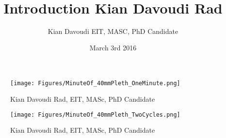 \documentclass{IEEEtran}
\title{Introduction Kian Davoudi Rad}
\author{Kian Davoudi EIT, MASC, PhD Candidate}
\date{March 3rd 2016}
\begin{document}
\maketitle

\begin{figure}[h!]
\centering
\texttt{[image: Figures/MinuteOf\_40mmPleth\_OneMinute.png]}
\caption{Kian Davoudi Rad, EIT, MASc, PhD Candidate}
\label{fig:kian}
\end{figure}


\begin{figure}[h!]
\centering
\texttt{[image: Figures/MinuteOf\_40mmPleth\_TwoCycles.png]}
\caption{Kian Davoudi Rad, EIT, MASc, PhD Candidate}
\label{fig:kian}
\end{figure}



\end{document}
